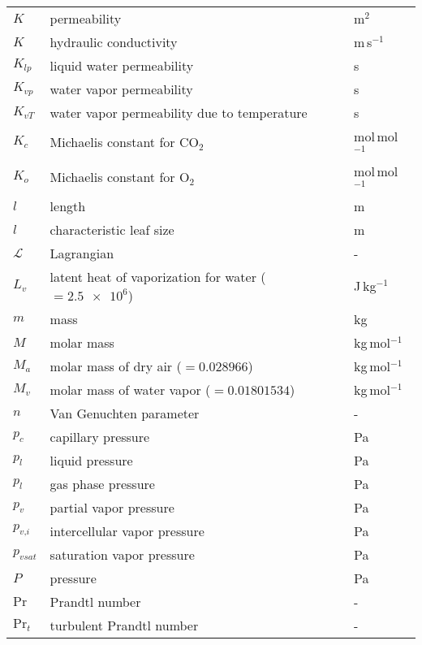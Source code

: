 \begin{longtable}{p{}p{}p{}}
	$K$ & permeability & m$^2$  \\ 
	$K$ & hydraulic conductivity & m\,s$^{-1}$  \\ 	
	$K_{\textit{lp}}$ & liquid water permeability & s \\ 	
	$K_{\textit{vp}}$ & water vapor permeability & s \\ 		
	$K_{\textit{vT}}$ & water vapor permeability due to temperature & s \\ 			
	$K_c$ & Michaelis constant for CO$_2$ & mol\,mol$^{-1}$ \\ 	
	$K_o$ & Michaelis constant for O$_2$ & mol\,mol$^{-1}$ \\ 		
	$l$ & length & m \\ 
	$l$ & characteristic leaf size & m \\ 	

	$\mathcal{L}$ & Lagrangian & - \\ 
	$L_v$ & latent heat of vaporization for water ($=\num{2.5e6}$) & J\,kg$^{-1}$ \\ 
	$m$ & mass & kg \\ 
	$M$ & molar mass & kg\,mol$^{-1}$ \\ 
	$M_a$ & molar mass of dry air ($=\num{0.028966}$) & kg\,mol$^{-1}$ \\ 	
	$M_v$ & molar mass of water vapor ($=\num{0.01801534}$) & kg\,mol$^{-1}$ \\ 		
	$n$ & Van Genuchten parameter & - \\
	$p_c$ & capillary pressure & Pa \\ 
	$p_l$ & liquid pressure & Pa \\ 	
	$p_l$ & gas phase pressure & Pa \\ 		
	$p_v$ & partial vapor pressure & Pa \\ 	
	$p_{\textit{v,i}}$ & intercellular vapor pressure & Pa \\ 			
	$p_{\textit{vsat}}$ & saturation vapor pressure & Pa \\ 		
	$P$ & pressure & Pa \\ 
	$\mathrm{Pr}$ & Prandtl number & - \\ 	
	$\mathrm{Pr}_t$ & turbulent Prandtl number & - \\ 		



\end{longtable}
